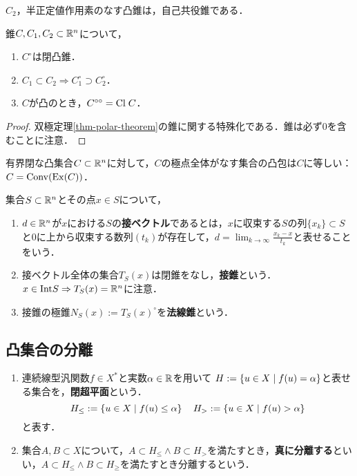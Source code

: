 \documentclass[uplatex,dvipdfmx]{jsreport}
\begin{document}
\begin{example}[自己共役錐]
    $C_2$，半正定値作用素のなす凸錐は，自己共役錐である．
\end{example}

\begin{corollary}[双極定理]
    錐$C,C_1,C_2\subset\mathbb{R}^n$について，
    \begin{enumerate}
        \item $C^\circ$は閉凸錐．
        \item $C_1\subset C_2\Rightarrow C_1^\circ\supset C_2^\circ$．
        \item $C$が凸のとき，$C^{\circ\circ}=\mathrm{Cl}\;C$．
    \end{enumerate}
\end{corollary}
\begin{proof}
    双極定理\ref{thm-polar-theorem}の錐に関する特殊化である．錐は必ず$0$を含むことに注意．
\end{proof}

\begin{corollary}
    有界閉な凸集合$C\subset\mathbb{R}^n$に対して，$C$の極点全体がなす集合の凸包は$C$に等しい：$C=\mathrm{Conv}(\mathrm{Ex}(C))$．
\end{corollary}

\begin{definition}
    集合$S\subset\mathbb{R}^n$とその点$x\in S$について，
    \begin{enumerate}
        \item $d\in\mathbb{R}^n$が$x$における$S$の\textbf{接ベクトル}であるとは，$x$に収束する$S$の列$\{x_k\}\subset S$と$0$に上から収束する数列$(t_k)$が存在して，$d=\lim_{k\to\infty}\frac{x_k-x}{t_k}$と表せることをいう．
        \item 接ベクトル全体の集合$T_S(x)$は閉錐をなし，\textbf{接錐}という．$x\in\mathrm{Int} S\Rightarrow T_S(x)=\mathbb{R}^n$に注意．
        \item 接錐の極錐$N_S(x):=T_S(x)^\circ$を\textbf{法線錐}という．
    \end{enumerate}
\end{definition}

\subsection{凸集合の分離}

\begin{definition}\mbox{}
    \begin{enumerate}
        \item 連続線型汎関数$f\in X^*$と実数$\alpha\in\mathbb{R}$を用いて
        $H:=\left\{u\in X\mid f(u)=\alpha\right\}$と表せる集合を，\textbf{閉超平面}という．
        \[H_\le:=\left\{u\in X\mid f(u)\le\alpha\right\}\quad H_>:=\left\{u\in X\mid f(u)>\alpha\right\}\]
        と表す．
        \item 集合$A,B\subset X$について，$A\subset H_\le\land B\subset H_>$を満たすとき，\textbf{真に分離する}といい，$A\subset H_\le\land B\subset H_\ge$を満たすとき分離するという．
    \end{enumerate}
\end{definition}
\end{document}
